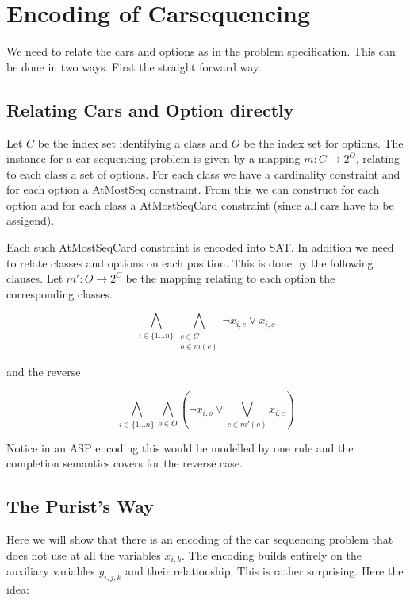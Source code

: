 \documentclass[]{llncs}
\begin{document}
\section{Encoding of Carsequencing}

We need to relate the cars and options as in the problem specification.
This can be done in two ways. First the straight forward way. 

\subsection{Relating Cars and Option directly}

Let $C$ be the index set identifying a class and $O$ be the index set
for options. The instance for a car sequencing problem is given by a
mapping $m : C\rightarrow 2^O$, relating to each class a set of options.
For each class we have a cardinality constraint and for each option a
AtMostSeq constraint. From this we can construct for each option and for
each class a AtMostSeqCard constraint (since all cars have to be
assigend). 

Each such AtMostSeqCard constraint is encoded into SAT. In addition we
need to relate classes and options on each position. This is done by the
following clauses.  Let $m':O \rightarrow 2^C$ be the mapping relating
to each option the corresponding classes. 

\begin{equation}
    \bigwedge_{i\in \{1\ldots n\}} \bigwedge_{\substack{c \in C \\ o \in m(c)}} \neg x_{i,c} \vee x_{i,o}
\end{equation}

and the reverse

\begin{equation}
    \bigwedge_{i \in \{1\dots n\}} \bigwedge_{o\in O} \left(\neg x_{i,o} \vee
    \bigvee_{c \in m'(o)} x_{i,c}\right)
\end{equation}

Notice in an ASP encoding this would be modelled by one rule and the
completion semantics covers for the reverse case. 

\subsection{The Purist's Way}

Here we will show that there is an encoding of the car sequencing
problem that does not use at all the variables $x_{i,k}$. The encoding
builds entirely on the auxiliary variables $y_{i,j,k}$ and their
relationship. This is rather surprising. Here the idea: 
\end{document}

